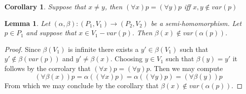 \documentclass{article}
\theoremstyle{problemstyle}
\theoremstyle{lemmastyle}
\newtheorem{lemma}{Lemma}
\theoremstyle{theoremstyle}
\theoremstyle{problemstyle}
\theoremstyle{problemstyle}
\newtheorem{corollary}{Corollary}
\begin{document}
\begin{corollary}
Suppose that $x \neq y$, then $(\forall x)p = (\forall y)p$ iff $x,y \notin var(p)$ 
\end{corollary}

\begin{lemma}
Let $(\alpha,\beta):(P_1,V_1) \rightarrow (P_2,V_2)$ be a semi-homomorphism. Let $p \in P_1$ and suppose that $x \in V_1-var(p)$. Then $\beta(x) \notin var(\alpha(p))$.  
\end{lemma}

\begin{proof}
Since $\beta(V_1)$ is infinite there exists a $y' \in \beta(V_1)$ such that $y' \notin \beta(var(p))$ and $y' \neq \beta(x)$. Choosing $y \in V_1$ such that $\beta(y) = y'$ it follows by the corrolary that $(\forall x)p = (\forall y)p$. Then we may compute $$(\forall \beta(x))p = \alpha((\forall x) p) = \alpha((\forall y) p)=(\forall \beta(y))p$$
From which we may conclude by the corollary that $\beta(x) \notin var(\alpha(p))$. 
\end{proof}
\end{document}
